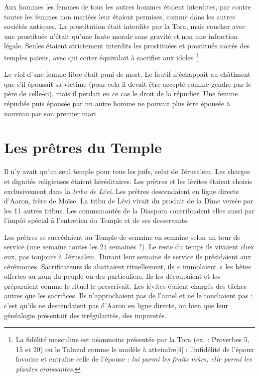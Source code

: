  Aux hommes les femmes de tous les autres hommes étaient interdites, par contre toutes les femmes non mariées leur étaient permises, comme dans les autres sociétés antiques. La prostitution était interdite par la Tora, mais coucher avec une prostituée n'était qu'une faute morale sans gravité et non une infraction légale. Seules étaient strictement interdits les prostituées et prostitués sacrés des temples païens, avec qui coïter équivalait à sacrifier aux idoles%
\footnote{La fidélité masculine est néanmoins présentée par la Tora (ex. : Proverbes 5, 15 et 20) ou le Talmud comme le modèle à atteindre[4] : l'infidélité de l'époux favorise et entraîne celle de l'épouse : \emph{lui parmi les fruits mûrs, elle parmi les plantes croissantes}.}%
. 

 Le viol d'une femme libre était puni de mort. Le fautif n'échappait au châtiment que s'il épousait sa victime (pour cela il devait être accepté comme gendre par le père de celle-ci), mais il perdait en ce cas le droit de la répudier. Une femme répudiée puis épousée par un autre homme ne pouvait plus être épousée à nouveau par son premier mari. 





\section{Les prêtres du Temple}

 Il n'y avait qu'un seul temple pour tous les juifs, celui de Jérusalem. Les charges et dignités religieuses étaient héréditaires. Les prêtres et les lévites étaient choisis exclusivement dans la \emph{tribu de Lévi}. Les prêtres descendaient en ligne directe d'Aaron, frère de Moïse. La tribu de Lévi vivait du produit de la Dîme versée par les 11 autres tribus. Les communautés de la Diaspora contribuaient elles aussi par l'impôt spécial  à l'entretien du Temple et de ses desservants. 

 Les prêtres se succédaient au Temple de semaine en semaine selon un tour de service (une semaine toutes les 24 semaines ?). Le reste du temps ils vivaient chez eux, pas toujours à Jérusalem. Durant leur semaine de service ils présidaient aux cérémonies. Sacrificateurs ils abattaient rituellement, ils « immolaient » les bêtes offertes au nom du peuple ou des particuliers. Ils les découpaient et les préparaient comme le rituel le prescrivait. Les lévites étaient chargés des tâches autres que les sacrifices. Ils n'approchaient pas de l'autel et ne le touchaient pas : c'est qu'ils ne descendaient pas d'Aaron en ligne directe, ou bien que leur généalogie présentait des irrégularités, des impuretés.


